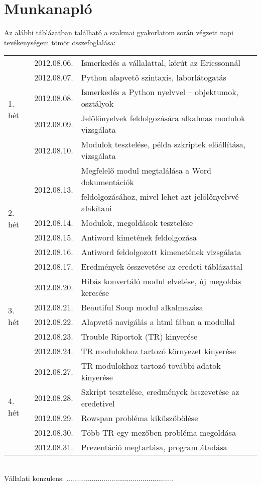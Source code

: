 \documentclass[a4paper,oneside,12pt]{article}
\begin{document}
\section{Munkanapló}
Az alábbi táblázatban található a szakmai gyakorlatom során végzett napi tevékenységem tömör összefoglalása:
%
\begin{table}[h!]
\centering
    \begin{tabular*}{\textwidth}{l||l|l@{\extracolsep{\fill}}}
        \multirow{5}{*}{1. hét} & 2012.08.06. & Ismerkedés a vállalattal, körút az Ericssonnál \\ & 2012.08.07. & Python alapvető szintaxis, laborlátogatás\\ & 2012.08.08. & Ismerkedés a Python nyelvvel -- objektumok, osztályok \\ & 2012.08.09. & Jelölőnyelvek feldolgozására alkalmas modulok vizsgálata \\ & 2012.08.10. & Modulok tesztelése, példa szkriptek előállítása, vizsgálata\\ \hline
		\multirow{6}{*}{2. hét} & \multirow{2}{*}{2012.08.13.} & Megfelelő modul megtalálása a Word dokumentációk \\ & & feldolgozásához, mivel lehet azt jelölőnyelvvé alakítani \\ & 2012.08.14. & Modulok, megoldások tesztelése \\ & 2012.08.15. & Antiword kimetének feldolgozása \\ & 2012.08.16. & Antiword feldolgozott kimenetének vizsgálata \\ & 2012.08.17. & Eredmények összevetése az eredeti táblázattal \\ \hline
		\multirow{5}{*}{3. hét} & 2012.08.20. & Hibás konvertáló modul elvetése, új megoldás keresése \\ & 2012.08.21. & Beautiful Soup modul alkalmazása \\ & 2012.08.22. & Alapvető navigálás a html fában a modullal \\ & 2012.08.23. & Trouble Riportok (TR) kinyerése \\ & 2012.08.24. & TR modulokhoz tartozó környezet kinyerése \\ \hline
		\multirow{5}{*}{4. hét} & 2012.08.27. & TR modulokhoz tartozó további adatok kinyerése \\ & 2012.08.28. & Szkript tesztelése, eredmények összevetése az eredetivel \\ & 2012.08.29. & Rowspan probléma kiküszöbölése \\ & 2012.08.30. & Több TR egy mezőben probléma megoldása \\ & 2012.08.31. & Prezentáció megtartása, program átadása
    \end{tabular*}
\end{table}
\\[40pt] Vállalati konzulens: \hfill .......................................................
%
\newpage
\end{document}
